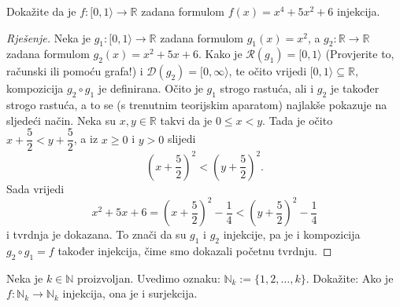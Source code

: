 \begin{exercise}
Dokažite da je $f : [0, 1\rangle\to \mathbb{R}$ zadana formulom $f(x)=x^4+5x^2+6$ injekcija.
\end{exercise}
\begin{proof}[Rješenje]
Neka je $g_1 : [0, 1\rangle\to \mathbb{R}$ zadana formulom $g_1(x)=x^2$, a $g_2 : \mathbb{R}\to \mathbb{R}$ zadana formulom $g_2(x)=x^2+5x+6$. Kako je $\mathcal{R}(g_1)=[0, 1\rangle$ (Provjerite to, računski ili pomoću grafa!) i $\mathcal{D}(g_2)=[0, \infty\rangle$, te očito vrijedi $[0, 1\rangle\subseteq \mathbb{R}$, kompozicija $g_2\circ g_1$ je definirana. Očito je $g_1$ strogo rastuća, ali i $g_2$ je također strogo rastuća, a to se (s trenutnim teorijskim aparatom) najlakše pokazuje na sljedeći način. Neka su $x, y\in \mathbb{R}$ takvi da je $0\leq x<y$. Tada je očito $x+\dfrac{5}{2}<y+\dfrac{5}{2}$, a iz $x\geq 0$ i $y>0$ slijedi $$\left(x+\dfrac{5}{2}\right)^2<\left(y+\dfrac{5}{2}\right)^2.$$ Sada vrijedi
$$x^2+5x+6=\left(x+\dfrac{5}{2}\right)^2-\dfrac{1}{4}<\left(y+\dfrac{5}{2}\right)^2-\dfrac{1}{4}$$
i tvrdnja je dokazana. To znači da su $g_1$ i $g_2$ injekcije, pa je i kompozicija $g_2\circ g_1=f$ također injekcija, čime smo dokazali početnu tvrdnju.
\end{proof}
\begin{exercise}
Neka je $k\in \mathbb{N}$ proizvoljan. Uvedimo oznaku: $\mathbb{N}_k:=\{1, 2,\dots, k\}$. Dokažite: Ako je $f : \mathbb{N}_k\to \mathbb{N}_k$ injekcija, ona je i surjekcija.
\end{exercise}
